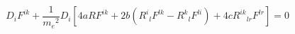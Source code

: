\begin{equation}
D_{i}F^{ik}+\frac{1}{{m_{e}}^{2}}D_{i}[4aRF^{ik}+2b({R^{i}}_{l}F^{lk}-{R^{k}}_{l}F^{li})+4c{R^{ik}}_{lr}F^{lr}]=0
\label{2}
\end{equation}


